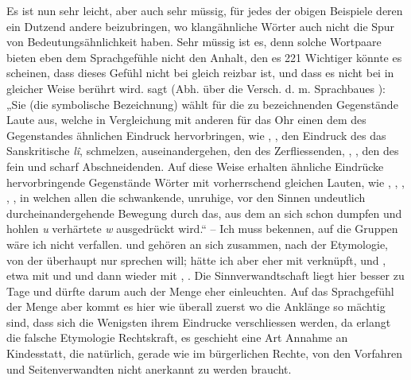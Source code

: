 {Es ist nun sehr leicht, aber auch sehr müssig, für jedes der obigen Beispiele deren ein Dutzend andere beizubringen, wo klangähnliche Wörter auch nicht die Spur von Bedeutungsähnlichkeit haben. Sehr müssig ist es, denn solche Wortpaare bieten eben dem Sprachgefühle nicht den Anhalt, den es  {\textbar}{\textbar}221{\textbar}{\textbar}\label{sp.221}  Wichtiger könnte es scheinen, dass dieses Gefühl nicht bei  gleich reizbar ist, und dass es nicht bei  in gleicher Weise berührt wird.  sagt (Abh. über die Versch. d. m. Sprachbaues ): „Sie (die symbolische Bezeichnung) wählt für die zu bezeichnenden Gegenstände Laute aus, welche   in Vergleichung mit anderen für das Ohr einen dem des Gegen\-\label{fp.220}standes ähnlichen Eindruck hervorbringen, wie , ,  den Eindruck des  das Sanskritische \textit{lî}, schmelzen, auseinandergehen, den des Zerfliessenden, , ,  den des fein und scharf Abschneidenden. Auf diese Weise erhalten ähnliche Eindrücke hervorbringende Gegenstände Wörter mit vorherrschend gleichen Lauten, wie , , , , , in welchen allen die schwankende, unruhige, vor den Sinnen undeutlich durcheinandergehende Bewegung durch das, aus dem an sich schon dumpfen und hohlen \textit{u} verhärtete \textit{w} ausgedrückt wird.“ – Ich muss bekennen, auf die  Gruppen wäre ich nicht verfallen.  und  gehören an sich zusammen, nach der  Etymologie, von der  überhaupt nur sprechen will;  hätte ich aber eher mit  verknüpft, und ,  etwa mit  und  und dann wieder mit , . Die Sinnverwandtschaft liegt hier besser zu Tage und dürfte darum auch der Menge eher einleuchten. Auf das Sprachgefühl der Menge aber kommt es hier wie überall zuerst  wo die Anklänge so mächtig sind, dass sich die Wenigsten ihrem Eindrucke verschliessen werden, da erlangt die falsche Etymologie Rechtskraft, es geschieht eine Art Annahme an Kindesstatt, die natürlich, gerade wie im bürgerlichen Rechte, von den Vorfahren und Seitenverwandten nicht anerkannt zu werden braucht.

}
